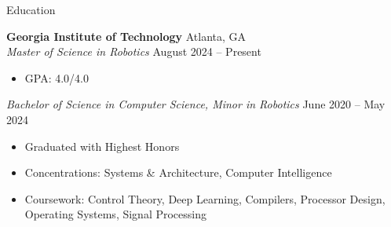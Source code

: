 \documentclass{resume} %
\begin{document}

\vspace{-0.5em}
\begin{rSection}{Education}

{\bf Georgia Institute of Technology} \hfill Atlanta, GA\\
\textit{Master of Science in Robotics} \hfill August 2024 -- Present
\vspace{-0.5em}
\begin{itemize}
   \itemsep -5pt {}
   \item GPA: 4.0/4.0
\end{itemize}
\vspace{-0.5em}
\textit{Bachelor of Science in Computer Science, Minor in Robotics} \hfill June 2020 -- May 2024
\vspace{-0.5em}
\begin{itemize}
   \itemsep -5pt {}
   \item Graduated with Highest Honors
   \item Concentrations: Systems \& Architecture, Computer Intelligence
   \item Coursework: Control Theory, Deep Learning, Compilers, Processor Design, Operating Systems,
   Signal Processing
\end{itemize}

\end{rSection}

\end{document}

